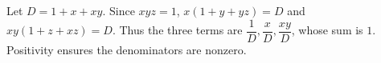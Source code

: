 Let $D=1+x+xy$. Since $xyz=1$, $x(1+y+yz)=D$ and $xy(1+z+xz)=D$. Thus the three terms are $\dfrac{1}{D},\dfrac{x}{D},\dfrac{xy}{D}$, whose sum is $\boxed1$. Positivity ensures the denominators are nonzero.
